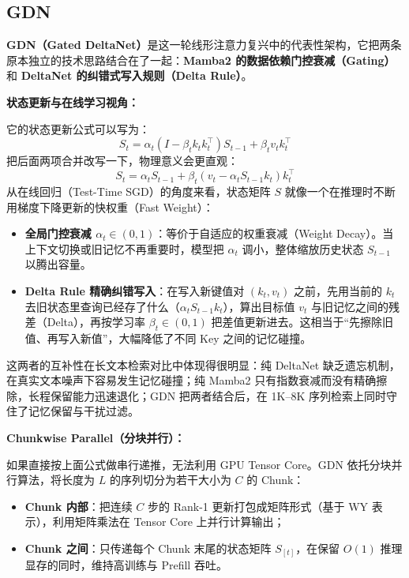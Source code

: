 \documentclass[11pt]{article}
\begin{document}
\subsection{GDN}

\textbf{GDN（Gated DeltaNet）}是这一轮线形注意力复兴中的代表性架构，它把两条原本独立的技术思路结合在了一起：\textbf{Mamba2 的数据依赖门控衰减（Gating）}和 \textbf{DeltaNet 的纠错式写入规则（Delta Rule）}。

\textbf{状态更新与在线学习视角：}

它的状态更新公式可以写为：
\[
  S_t = \alpha_t \left(I - \beta_t k_t k_t^\top\right) S_{t-1} + \beta_t v_t k_t^\top
\]
把后面两项合并改写一下，物理意义会更直观：
\[
  S_t = \alpha_t S_{t-1} + \beta_t \left(v_t - \alpha_t S_{t-1} k_t\right) k_t^\top
\]
从在线回归（Test-Time SGD）的角度来看，状态矩阵 $S$ 就像一个在推理时不断用梯度下降更新的快权重（Fast Weight）：

\begin{itemize}
  \item \textbf{全局门控衰减 $\alpha_t \in (0, 1)$}：等价于自适应的权重衰减（Weight Decay）。当上下文切换或旧记忆不再重要时，模型把 $\alpha_t$ 调小，整体缩放历史状态 $S_{t-1}$ 以腾出容量。
  \item \textbf{Delta Rule 精确纠错写入}：在写入新键值对 $(k_t, v_t)$ 之前，先用当前的 $k_t$ 去旧状态里查询已经存了什么（$\alpha_t S_{t-1} k_t$），算出目标值 $v_t$ 与旧记忆之间的残差（Delta），再按学习率 $\beta_t \in (0, 1)$ 把差值更新进去。这相当于“先擦除旧值、再写入新值”，大幅降低了不同 Key 之间的记忆碰撞。
\end{itemize}

这两者的互补性在长文本检索对比中体现得很明显：纯 DeltaNet 缺乏遗忘机制，在真实文本噪声下容易发生记忆碰撞；纯 Mamba2 只有指数衰减而没有精确擦除，长程保留能力迅速退化；GDN 把两者结合后，在 1K--8K 序列检索上同时守住了记忆保留与干扰过滤。

\textbf{Chunkwise Parallel（分块并行）：}

如果直接按上面公式做串行递推，无法利用 GPU Tensor Core。GDN 依托分块并行算法，将长度为 $L$ 的序列切分为若干大小为 $C$ 的 Chunk：

\begin{itemize}
  \item \textbf{Chunk 内部}：把连续 $C$ 步的 Rank-1 更新打包成矩阵形式（基于 WY 表示），利用矩阵乘法在 Tensor Core 上并行计算输出；
  \item \textbf{Chunk 之间}：只传递每个 Chunk 末尾的状态矩阵 $S_{[t]}$，在保留 $O(1)$ 推理显存的同时，维持高训练与 Prefill 吞吐。
\end{itemize}
\end{document}
